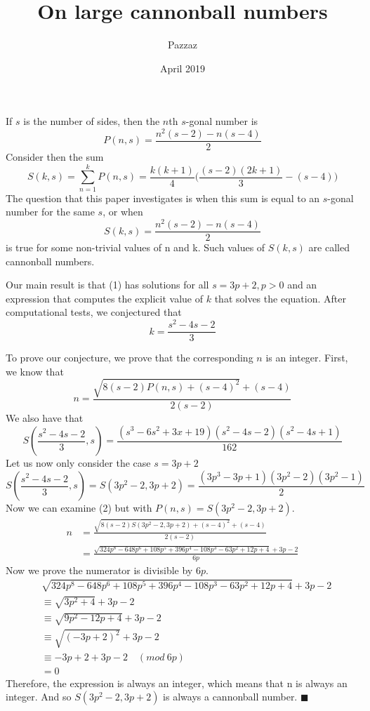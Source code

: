 \documentclass{article}
\title{On large cannonball numbers}
\author{Pazzaz}
\date{April 2019}
\begin{document}
\maketitle

If $s$ is the number of sides, then the $n$th $s$-gonal number is
$$
P(n, s) = \frac{n^2(s-2)-n(s-4)}{2}
$$
Consider then the sum
$$
S(k, s) = \sum_{n=1}^{k} P(n, s)=\frac{k(k+1)}{4}\Bigg(\frac{(s-2)(2k+1)}{3}-(s-4)\Bigg)
$$
The question that this paper investigates is when this sum is equal to an $s$-gonal number for the same $s$, or when
\begin{equation}
S(k, s) = \frac{n^2(s-2)-n(s-4)}{2}
\end{equation}
is true for some non-trivial values of n and k. Such values of $S(k, s)$ are called cannonball numbers.

Our main result is that (1) has solutions for all $s=3p+2, p>0$ and an expression that computes the explicit value of $k$ that solves the equation.
After computational tests, we conjectured that
$$
k= \frac{s^2-4s-2}{3}
$$

To prove our conjecture, we prove that the corresponding $n$ is an integer. First, we know that
\begin{equation}
n= \frac{\sqrt{8(s-2)P(n, s)+(s-4)^2}+(s-4)}{2(s-2)}
\end{equation}
We also have that
$$
S(\frac{s^2-4s-2}{3}, s)=\frac{(s^3-6s^2+3x+19)(s^2-4s-2)(s^2-4s+1)}{162}
$$
Let us now only consider the case $s=3p+2$
$$
S(\frac{s^2-4s-2}{3}, s)=S(3p^2-2, 3p+2)=\frac{\left(3p^3-3p+1\right)\left(3p^2-2\right)\left(3p^2-1\right)}{2}
$$
Now we can examine (2) but with $P(n, s)=S(3p^2-2, 3p+2)$.
\begin{equation*}
\begin{split}
n &= \frac{\sqrt{8(s-2)S(3p^2-2, 3p+2)+(s-4)^2}+(s-4)}{2(s-2)}\\&= \frac{\sqrt{324p^8-648p^6+108p^5+396p^4-108p^3-63p^2+12p+4}+3p-2}{6p}
\end{split}
\end{equation*}
Now we prove the numerator is divisible by $6p$.
\begin{equation*}
\begin{split}
&\sqrt{324p^8-648p^6+108p^5+396p^4-108p^3-63p^2+12p+4}+3p-2\\
&\equiv\sqrt{3p^2+4}+3p-2 \\
&\equiv\sqrt{9p^2-12p+4}+3p-2 \\
&\equiv\sqrt{(-3p+2)^2}+3p-2 \\
&\equiv-3p+2+3p-2\quad(mod\ 6p)\\
&=0
\end{split}
\end{equation*}
Therefore, the expression is always an integer, which means that n is always an integer. And so $S(3p^2-2, 3p+2)$ is always a cannonball number. $\blacksquare$
\end{document}
